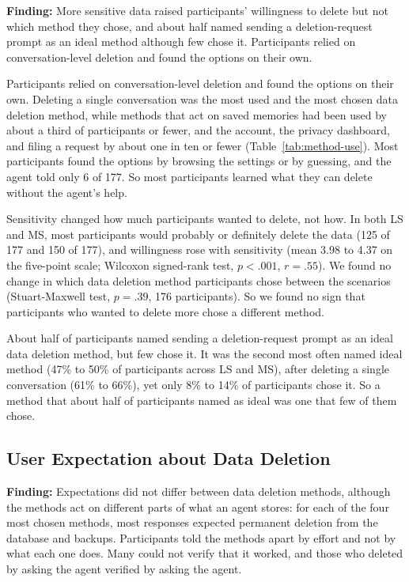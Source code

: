 \begin{takeawaybox}
\textbf{Finding:} More sensitive data raised participants' willingness to delete but not which method they chose, and about half named sending a deletion-request prompt as an ideal method although few chose it. Participants relied on conversation-level deletion and found the options on their own.
\end{takeawaybox}

Participants relied on conversation-level deletion and found the options on their own. Deleting a single conversation was the most used and the most chosen data deletion method, while methods that act on saved memories had been used by about a third of participants or fewer, and the account, the privacy dashboard, and filing a request by about one in ten or fewer (Table~\ref{tab:method-use}). Most participants found the options by browsing the settings or by guessing, and the agent told only 6 of 177. So most participants learned what they can delete without the agent's help.

Sensitivity changed how much participants wanted to delete, not how. In both LS and MS, most participants would probably or definitely delete the data (125 of 177 and 150 of 177), and willingness rose with sensitivity (mean 3.98 to 4.37 on the five-point scale; Wilcoxon signed-rank test, $p<.001$, $r=.55$). We found no change in which data deletion method participants chose between the scenarios (Stuart-Maxwell test, $p=.39$, 176 participants). So we found no sign that participants who wanted to delete more chose a different method.

About half of participants named sending a deletion-request prompt as an ideal data deletion method, but few chose it. It was the second most often named ideal method (47\% to 50\% of participants across LS and MS), after deleting a single conversation (61\% to 66\%), yet only 8\% to 14\% of participants chose it. So a method that about half of participants named as ideal was one that few of them chose.

\subsection{User Expectation about Data Deletion}

\begin{takeawaybox}
\textbf{Finding:} Expectations did not differ between data deletion methods, although the methods act on different parts of what an agent stores: for each of the four most chosen methods, most responses expected permanent deletion from the database and backups. Participants told the methods apart by effort and not by what each one does. Many could not verify that it worked, and those who deleted by asking the agent verified by asking the agent.
\end{takeawaybox}

